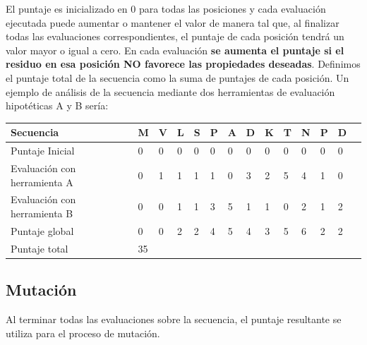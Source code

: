 El puntaje es inicializado en 0 para todas las posiciones y cada evaluación ejecutada puede aumentar o mantener el valor de manera tal que, 
al finalizar todas las evaluaciones correspondientes, el puntaje de cada posición tendrá un valor mayor o igual a cero.
En cada evaluación \textbf{se aumenta el puntaje si el residuo en esa posición NO favorece las propiedades deseadas}.
Definimos el puntaje total de la secuencia como la suma de puntajes de cada posición.
Un ejemplo de análisis de la secuencia mediante dos herramientas de evaluación hipotéticas A y B sería: %

\vspace{0.3cm}
\begin{tabular}{llllllllllllll} 
\hline
Secuencia & \textbf{M} & \textbf{V} & \textbf{L} & \textbf{S} & \textbf{P} & \textbf{A} & \textbf{D} & \textbf{K} & \textbf{T} & \textbf{N} & \textbf{P} & \textbf{D} \\ \hline
Puntaje Inicial & 0 & 0 & 0 & 0 & 0 & 0 & 0 & 0 & 0 & 0 & 0 & 0\\ \hline
Evaluación con herramienta A & 0 & 1 & 1 & 1 & 1 & 0 & 3 & 2 & 5 & 4 & 1 & 0\\ \hline
Evaluación con herramienta B & 0 & 0 & 1 & 1 & 3 & 5 & 1 & 1 & 0 & 2 & 1 & 2\\ \hline
Puntaje global & 0 & 0 & 2 & 2 & 4 & 5 & 4 & 3 & 5 & 6 & 2 & 2\\ \hline
Puntaje total  & 35 \\ \hline
\end{tabular}

\vspace{0.5cm}



\subsection{Mutación}\label{mutacion}

Al terminar todas las evaluaciones sobre la secuencia, el puntaje resultante se utiliza para el proceso de mutación.



